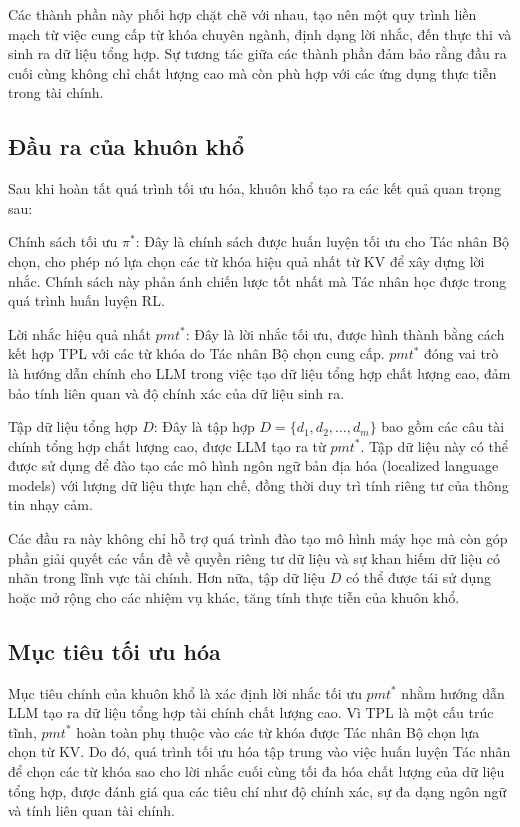 \documentclass[a4paper,10pt]{article}
\begin{document}
Các thành phần này phối hợp chặt chẽ với nhau, tạo nên một quy trình liền mạch từ việc cung cấp từ khóa chuyên ngành, định dạng lời nhắc, đến thực thi và sinh ra dữ liệu tổng hợp. Sự tương tác giữa các thành phần đảm bảo rằng đầu ra cuối cùng không chỉ chất lượng cao mà còn phù hợp với các ứng dụng thực tiễn trong tài chính.
\subsection{Đầu ra của khuôn khổ}

Sau khi hoàn tất quá trình tối ưu hóa, khuôn khổ tạo ra các kết quả quan trọng sau:

Chính sách tối ưu \(\pi^*\): Đây là chính sách được huấn luyện tối ưu cho Tác nhân Bộ chọn, cho phép nó lựa chọn các từ khóa hiệu quả nhất từ KV để xây dựng lời nhắc. Chính sách này phản ánh chiến lược tốt nhất mà Tác nhân học được trong quá trình huấn luyện RL.

Lời nhắc hiệu quả nhất \(pmt^*\): Đây là lời nhắc tối ưu, được hình thành bằng cách kết hợp TPL với các từ khóa do Tác nhân Bộ chọn cung cấp. \(pmt^*\) đóng vai trò là hướng dẫn chính cho LLM trong việc tạo dữ liệu tổng hợp chất lượng cao, đảm bảo tính liên quan và độ chính xác của dữ liệu sinh ra.

Tập dữ liệu tổng hợp \(D\): Đây là tập hợp \(D = \{d_1, d_2, \ldots, d_m\}\) bao gồm các câu tài chính tổng hợp chất lượng cao, được LLM tạo ra từ \(pmt^*\). Tập dữ liệu này có thể được sử dụng để đào tạo các mô hình ngôn ngữ bản địa hóa (localized language models) với lượng dữ liệu thực hạn chế, đồng thời duy trì tính riêng tư của thông tin nhạy cảm.

Các đầu ra này không chỉ hỗ trợ quá trình đào tạo mô hình máy học mà còn góp phần giải quyết các vấn đề về quyền riêng tư dữ liệu và sự khan hiếm dữ liệu có nhãn trong lĩnh vực tài chính. Hơn nữa, tập dữ liệu \(D\) có thể được tái sử dụng hoặc mở rộng cho các nhiệm vụ khác, tăng tính thực tiễn của khuôn khổ.
\subsection{Mục tiêu tối ưu hóa}
Mục tiêu chính của khuôn khổ là xác định lời nhắc tối ưu \(pmt^*\) nhằm hướng dẫn LLM tạo ra dữ liệu tổng hợp tài chính chất lượng cao. Vì TPL là một cấu trúc tĩnh, \(pmt^*\) hoàn toàn phụ thuộc vào các từ khóa được Tác nhân Bộ chọn lựa chọn từ KV. Do đó, quá trình tối ưu hóa tập trung vào việc huấn luyện Tác nhân để chọn các từ khóa sao cho lời nhắc cuối cùng tối đa hóa chất lượng của dữ liệu tổng hợp, được đánh giá qua các tiêu chí như độ chính xác, sự đa dạng ngôn ngữ và tính liên quan tài chính.
\end{document}
